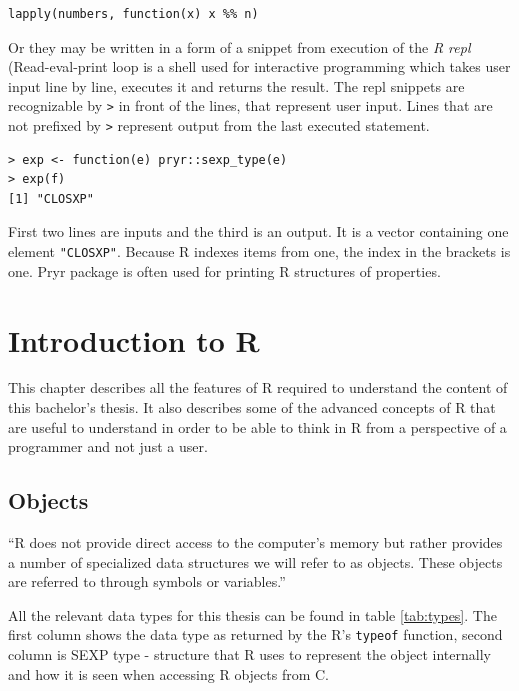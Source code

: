 \documentclass[thesis=B,english]{FITthesis}[2012/10/20]
\begin{document}
\begin{verbatim}
lapply(numbers, function(x) x %% n)
\end{verbatim}

Or they may be written in a form of a snippet from execution of the \emph{R repl} (Read-eval-print loop is a shell used for interactive programming which takes user input line by line, executes it and returns the result. The repl snippets are recognizable by \verb|>| in front of the lines, that represent user input. Lines that are not prefixed by \verb|>| represent output from the last executed statement.

\begin{verbatim}
> exp <- function(e) pryr::sexp_type(e)
> exp(f)
[1] "CLOSXP"

\end{verbatim}

First two lines are inputs and the third is an output. It is a vector containing one element \verb|"CLOSXP"|. Because R indexes items from one, the index in the brackets is one. Pryr package\cite{pryr} is often used for printing R structures of properties.


\chapter{Introduction to R} \label{chap:R}
This chapter describes all the features of R required to understand the content of this bachelor’s thesis. It also describes some of the advanced concepts of R that are useful to understand in order to be able to think in R from a perspective of a programmer and not just a user.

\section{Objects}
``R does not provide direct access to the computer’s memory but rather provides a number of specialized data structures we will refer to as objects. These objects are referred to through symbols or variables.'' \cite{specs}

All the relevant data types for this thesis can be found in table \ref{tab:types}. The first column shows the data type as returned by the R’s \verb|typeof| function, second column is SEXP type - structure that R uses to represent the object internally and how it is seen when accessing R objects from C.
\end{document}
